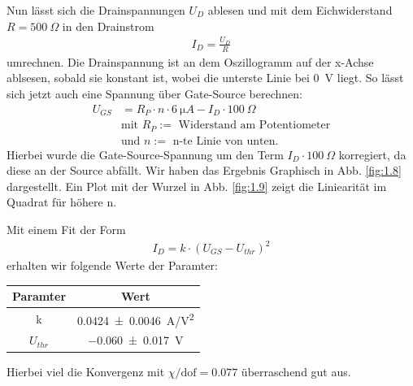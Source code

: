 \documentclass[10pt]{article}
\newenvironment{Figure}
  {\par\medskip\noindent\minipage{\linewidth}}
  {\endminipage\par\medskip}
\begin{document}
\begin{multicols}{2}
	Nun lässt sich die Drainspannungen $U_D$ ablesen und mit dem Eichwiderstand $R = \SI{500}{\Omega}$ in den Drainstrom
	\begin{align*}
		I_D = \frac{U_D}{R}
	\end{align*}
	umrechnen. Die Drainspannung ist an dem Oszillogramm auf der x-Achse ablsesen, sobald sie konstant ist, wobei die unterste Linie bei \SI{0}{V} liegt. So lässt sich jetzt auch eine Spannung über Gate-Source berechnen:
	\begin{align*}
		U_{GS} & = R_P \cdot n \cdot \SI{6}{\micro A} - I_D \cdot \SI{100}{\Omega} \\
		       & \text{mit } R_P:=\text{ Widerstand am Potentiometer}              \\
		       & \text{und } n:=\text{ n-te Linie von unten.}
	\end{align*}
	Hierbei wurde die Gate-Source-Spannung um den Term $I_D \cdot \SI{100}{\Omega}$ korregiert, da diese an der Source abfällt. Wir haben das Ergebnis Graphisch in Abb. \ref{fig:1.8} dargestellt. Ein Plot mit der Wurzel in Abb. \ref{fig:1.9} zeigt die Liniearität im Quadrat für höhere n.
	\begin{Figure}
		\centering\resizebox{\textwidth}{!}{}
		\label{fig:1.8}
	\end{Figure}
	\begin{Figure}
		\centering\resizebox{\textwidth}{!}{}
		\label{fig:1.9}
	\end{Figure}

	Mit einem Fit der Form
	\begin{align*}
		I_D=k\cdot(U_{GS} - U_{thr})^2
	\end{align*}
	erhalten wir folgende Werte der Paramter:
	\begin{center}
		\begin{tabular}{|c|c|}
			\hline
			Paramter  & Wert                       \\
			\hline
			k         & \SI{0.0424+-0.0046}{A/V^2} \\
			$U_{thr}$ & \SI{-0.060+-0.017}{V}      \\
			\hline
		\end{tabular}
		\label{Tab:1.2}
	\end{center}
	Hierbei viel die Konvergenz mit $\chi/\text{dof}=0.077$ überraschend gut aus.



\end{multicols}
\end{document}
